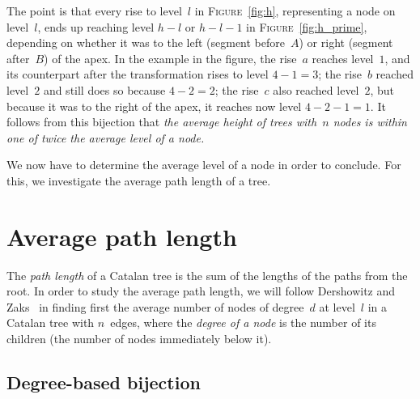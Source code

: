 \documentclass[11pt]{article}
\newcommand\fig{\textsc{Figure}}
\begin{document}
The point is that every rise to level~$l$ in \fig~\ref{fig:h},
representing a node on level~$l$, ends up reaching level $h-l$ or
$h-l-1$ in \fig~\ref{fig:h_prime}, depending on whether it was to the
left (segment before~$A$) or right (segment after~$B$) of the apex.
In the example in the figure, the rise~$a$ reaches level~$1$, and its
counterpart after the transformation rises to level \(4-1=3\); the
rise~$b$ reached level~$2$ and still does so because \(4-2=2\); the
rise~$c$ also reached level~$2$, but because it was to the right of
the apex, it reaches now level \(4-2-1=1\).  It follows from this
bijection that \emph{the average height of trees with~$n$ nodes is
  within one of twice the average level of a node.}

We now have to determine the average level of a node in order to
conclude. For this, we investigate the average path length of a tree.

\section{Average path length}

The \emph{path length} of a Catalan tree is the sum of the lengths of
the paths from the root. In order to study the average path length, we
will follow Dershowitz and Zaks~\cite{DershowitzZaks:1981} in finding
first the average number of nodes of degree~\(d\) at level~\(l\) in a
Catalan tree with \(n\)~edges, where the \emph{degree of a node} is
the number of its children (the number of nodes immediately below it).

\subsection{Degree-based bijection}
\end{document}
